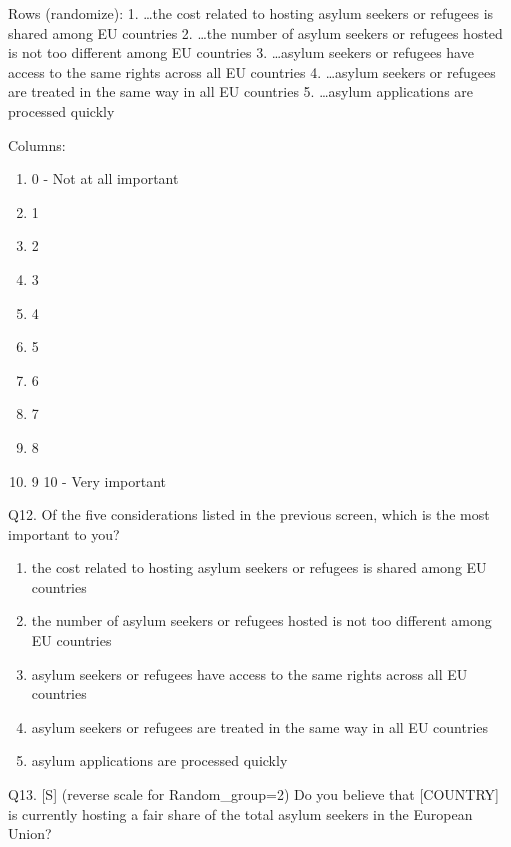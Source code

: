 \documentclass[
  12pt,
  a4paper,
]{article}
\providecommand{\tightlist}{%
  \setlength{\itemsep}{0pt}\setlength{\parskip}{0pt}}
\begin{document}
Rows (randomize):
1. \ldots the cost related to hosting asylum seekers or refugees is shared among EU countries
2. \ldots the number of asylum seekers or refugees hosted is not too different among EU countries
3. \ldots asylum seekers or refugees have access to the same rights across all EU countries
4. \ldots asylum seekers or refugees are treated in the same way in all EU countries
5. \ldots asylum applications are processed quickly

Columns:

\begin{enumerate}
\def\labelenumi{\arabic{enumi}.}
\tightlist
\item
  0 - Not at all important\\
\item
  1
\item
  2
\item
  3
\item
  4
\item
  5
\item
  6
\item
  7
\item
  8
\item
  9
  10 - Very important
\end{enumerate}

Q12. Of the five considerations listed in the previous screen, which is the most important to you?

\begin{enumerate}
\def\labelenumi{\arabic{enumi}.}
\tightlist
\item
  the cost related to hosting asylum seekers or refugees is shared among EU countries\\
\item
  the number of asylum seekers or refugees hosted is not too different among EU countries\\
\item
  asylum seekers or refugees have access to the same rights across all EU countries\\
\item
  asylum seekers or refugees are treated in the same way in all EU countries\\
\item
  asylum applications are processed quickly
\end{enumerate}

Q13. {[}S{]} (reverse scale for Random\_group=2) Do you believe that {[}COUNTRY{]} is currently hosting a fair share of the total asylum seekers in the European Union?
\end{document}

